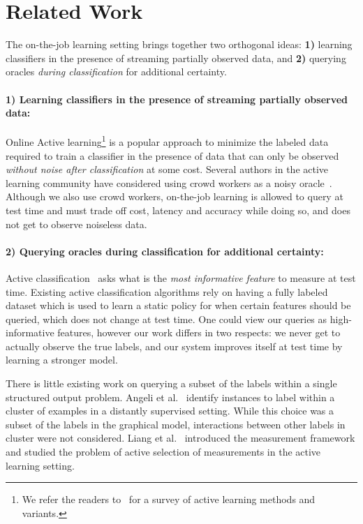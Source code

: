 \section{Related Work}
\label{sec:related}

The on-the-job learning setting brings together two orthogonal ideas: \textbf{1)} learning classifiers in the presence of streaming partially observed data, and \textbf{2)} querying oracles {\em during classification} for additional certainty.

\paragraph{1) Learning classifiers in the presence of streaming partially observed data:}

Online Active learning\footnote{We refer the readers to~\cite{settles2010active} for a survey of active learning methods and variants.} is a popular approach to minimize the labeled data required to train a classifier in the presence of data that can only be observed {\em without noise after classification} at some cost.
Several authors in the active learning community have considered using crowd workers as a noisy oracle~\cite{donmez2008proactive,golovin2010near,yan2011active,vijayanarasimhan2014large}.
Although we also use crowd workers, on-the-job learning is allowed to query at test time and must trade off cost, latency and accuracy while doing so, and does not get to observe noiseless data.

\paragraph{2) Querying oracles during classification for additional certainty:}

Active classification~\cite{greiner2002learning,chai2004test,esmeir2007anytime} asks what is the {\em most informative feature\/} to measure at test time.
Existing active classification algorithms rely on having a fully labeled dataset which is used to learn a static policy for when certain features should be queried, which does not change at test time.
One could view our queries as high-informative features, however our work differs in two respects: we never get to actually observe the true labels, and our system improves itself at test time by learning a stronger model.

There is little existing work on querying a subset of the labels within a single structured output problem.
Angeli et al.~\cite{angeli2014combining} identify instances to label within a cluster of examples in a distantly supervised setting. While this choice was a subset of the labels in the graphical model, interactions between other labels in cluster were not considered.
Liang et al.~\cite{liang09measurements} introduced the measurement framework and studied the problem of active selection of measurements in the active learning setting.

